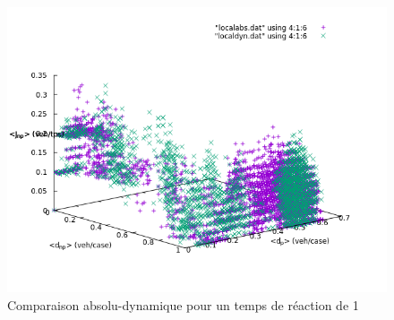 \documentclass[11pt]{article}
\begin{document}
\begin{figure}[ht]
		\begin{center}
			\includegraphics[scale=0.35]{./diagrammes-fondamentaux/localabsdyn1w}
		\end{center}
		\caption{\label{labstr}Comparaison absolu-dynamique pour un temps de réaction de 1}
\end{figure}
\end{document}
